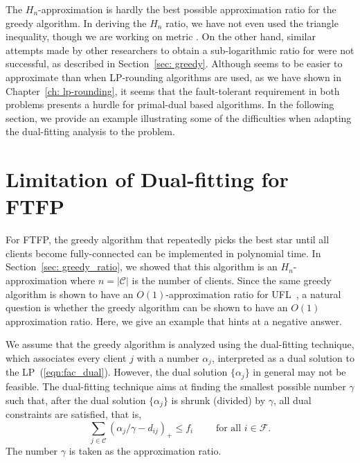 \documentclass[oneside,final]{ucr}
\begin{document}
The $H_n$-approximation is hardly the best possible
approximation ratio for the greedy algorithm. In deriving
the $H_n$ ratio, we have not even used the triangle
inequality, though we are working on metric {\FTFP}. On the
other hand, similar attempts made by other researchers to
obtain a sub-logarithmic ratio for {\FTFL} were not
successful, as described in Section~\ref{sec:
  greedy}. Although {\FTFP} seems to be easier to
approximate than {\FTFL} when LP-rounding algorithms are
used, as we have shown in Chapter~\ref{ch: lp-rounding}, it
seems that the fault-tolerant requirement in both problems
presents a hurdle for primal-dual based algorithms. In the
following section, we provide an example illustrating some
of the difficulties when adapting the dual-fitting analysis
to the {\FTFP} problem.

\section{Limitation of Dual-fitting for FTFP}
\label{sec: greedy_example}
For FTFP, the greedy algorithm that repeatedly picks the
best star until all clients become fully-connected can be
implemented in polynomial time. In Section~\ref{sec:
  greedy_ratio}, we showed that this algorithm is an
$H_n$-approximation where $n=|\mathcal C|$ is the number of
clients. Since the same greedy algorithm is shown to have an
$O(1)$-approximation ratio for UFL~\cite{MahdianMSV01}, a
natural question is whether the greedy algorithm can be
shown to have an $O(1)$ approximation ratio. Here, we give
an example that hints at a negative answer.

We assume that the greedy algorithm is analyzed using the
dual-fitting technique, which associates every client $j$
with a number $\alpha_j$, interpreted as a dual solution to
the LP~(\ref{eqn:fac_dual}). However, the dual solution
$\{\alpha_j\}$ in general may not be feasible. The
dual-fitting technique aims at finding the smallest possible
number $\gamma$ such that, after the dual solution
$\{\alpha_j\}$ is shrunk (divided) by $\gamma$, all dual
constraints are satisfied, that is,
\begin{equation*}
\sum_{j\in \mathcal C} (\alpha_j/\gamma
- d_{ij})_+ \leq f_i \qquad \text{ for all } i\in \mathcal F. 
\end{equation*}
The number $\gamma$ is taken as the approximation ratio.
\end{document}
